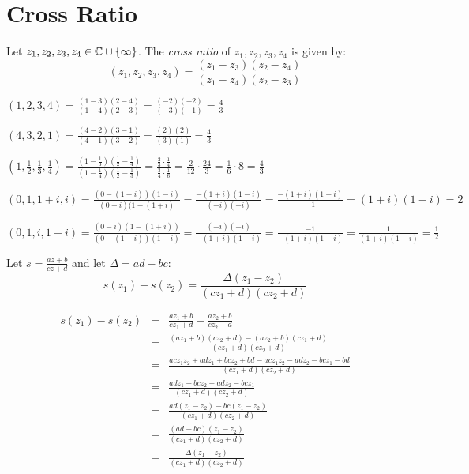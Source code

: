 \documentclass[letterpaper,12pt,fleqn]{article}
\newcommand{\CI}{\C\cup\{\infty\}}
\newcommand{\D}{\Delta}
\begin{document}
\section*{Cross Ratio}

\begin{definition}
  Let $z_1,z_2,z_3,z_4\in\CI$. The \emph{cross ratio} of $z_1,z_2,z_3,z_4$ is
  given by:
  \[(z_1,z_2,z_3,z_4)=\frac{(z_1-z_3)(z_2-z_4)}{(z_1-z_4)(z_2-z_3)}\]
\end{definition}

\begin{example}
  $(1,2,3,4)=\frac{(1-3)(2-4)}{(1-4)(2-3)}=\frac{(-2)(-2)}{(-3)(-1)}=
  \frac{4}{3}$

  $(4,3,2,1)=\frac{(4-2)(3-1)}{(4-1)(3-2)}=\frac{(2)(2)}{(3)(1)}=
  \frac{4}{3}$

  $(1,\frac{1}{2},\frac{1}{3},\frac{1}{4})=
  \frac{(1-\frac{1}{3})(\frac{1}{2}-\frac{1}{4})}
       {(1-\frac{1}{4})(\frac{1}{2}-\frac{1}{3})}=
       \frac{\frac{2}{3}\cdot\frac{1}{4}}{\frac{3}{4}\cdot\frac{1}{6}}=
       \frac{2}{12}\cdot\frac{24}{3}=\frac{1}{6}\cdot8=\frac{4}{3}$
\end{example}

\begin{example}
  $(0,1,1+i,i)=\frac{(0-(1+i))(1-i)}{(0-i)(1-(1+i)}=
  \frac{-(1+i)(1-i)}{(-i)(-i)}=\frac{-(1+i)(1-i)}{-1}=(1+i)(1-i)=2$

  $(0,1,i,1+i)=\frac{(0-i)(1-(1+i))}{(0-(1+i))(1-i)}=
  \frac{(-i)(-i)}{-(1+i)(1-i)}=\frac{-1}{-(1+i)(1-i)}=
  \frac{1}{(1+i)(1-i)}=\frac{1}{2}$
\end{example}

\begin{lemma}
  Let $s=\frac{az+b}{cz+d}$ and let $\D=ad-bc$:
  \[s(z_1)-s(z_2)=\frac{\D(z_1-z_2)}{(cz_1+d)(cz_2+d)}\]
\end{lemma}

\begin{theproof}
  \listbreak
  \begin{eqnarray*}
    s(z_1)-s(z_2) &=& \frac{az_1+b}{cz_1+d}-\frac{az_2+b}{cz_2+d} \\
    &=& \frac{(az_1+b)(cz_2+d)-(az_2+b)(cz_1+d)}{(cz_1+d)(cz_2+d)} \\
    &=& \frac{acz_1z_2+adz_1+bcz_2+bd-acz_1z_2-adz_2-bcz_1-bd}
    {(cz_1+d)(cz_2+d)} \\
    &=& \frac{adz_1+bcz_2-adz_2-bcz_1}{(cz_1+d)(cz_2+d)} \\
    &=& \frac{ad(z_1-z_2)-bc(z_1-z_2)}{(cz_1+d)(cz_2+d)} \\
    &=& \frac{(ad-bc)(z_1-z_2)}{(cz_1+d)(cz_2+d)} \\
    &=& \frac{\D(z_1-z_2)}{(cz_1+d)(cz_2+d)}
  \end{eqnarray*}
\end{theproof}
\end{document}
